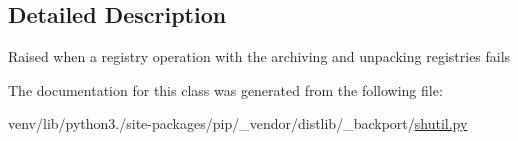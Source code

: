 \subsection{Detailed Description}
\begin{DoxyVerb}Raised when a registry operation with the archiving
and unpacking registries fails\end{DoxyVerb}
 

The documentation for this class was generated from the following file\+:\begin{DoxyCompactItemize}
\item 
venv/lib/python3./site-\/packages/pip/\+\_\+vendor/distlib/\+\_\+backport/\hyperlink{shutil_8py}{shutil.\+py}\end{DoxyCompactItemize}
